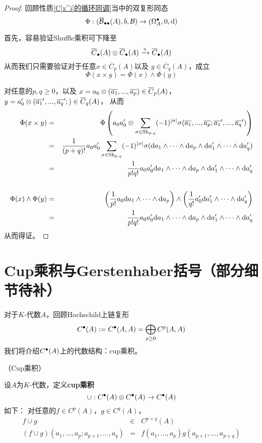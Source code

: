 \begin{proof}
回顾性质\ref{C[x^i]的循环同调}当中的双复形同态
$$\Phi:(\overline{\mathcal{B}}_{\bullet\bullet}(A),b,\mathcal{B})
\to(\Omega^{\bullet}_A,0,\mathrm{d})$$

首先，容易验证Shuffle乘积可下降至
$$\overline{C}_{\bullet}(A)\otimes\overline{C}_{\bullet}(A)
\xrightarrow{\times}\overline{C}_{\bullet}(A)$$
从而我们只需要验证对于任意$x\in\overline{C}_p(A)$以及
$y\in\overline{C}_q(A)$，成立
$$\Phi(x\times y)=\Phi(x)\wedge\Phi(y)$$

对任意的$p,q\geq 0$，以及
$x=a_0\otimes(\overline{a_1},...,\overline{a_p})\in\overline{C}_p(A)$，
$y=a_0'\otimes(\overline{a_1}',...,\overline{a_q}';)\in\overline{C}_q(A)$，
从而
\begin{eqnarray*}
     \Phi(x\times y)
&=&
     \Phi\left(
            a_0a_0'\otimes
            \sum_{\sigma\in\operatorname{Sh}_{p,q}}(-1)^{|\sigma|}
              \sigma(\overline{a_1},...,\overline{a_p};
                   \overline{a_1}',...,\overline{a_q}')
         \right)\\
&=&
     \frac{1}{(p+q)!}a_0a_0'
     \sum_{\sigma\in\operatorname{Sh}_{p,q}}(-1)^{|\sigma|}
       \sigma(\mathrm{d} a_1\wedge\cdots\wedge \mathrm{d} a_p
         \wedge \mathrm{d} a_1'\wedge\cdots\wedge\mathrm{d} a_q')\\
&=&
     \frac{1}{p!q!}
     a_0a_0'\mathrm{d} a_1\wedge\cdots\wedge \mathrm{d} a_p
     \wedge \mathrm{d} a_1'\wedge\cdots\wedge\mathrm{d} a_q'\\
& &
     \\
     \Phi(x)\wedge\Phi(y)
&=&
     \left(
       \frac{1}{p!}
       a_0\mathrm{d} a_1\wedge\cdots\wedge \mathrm{d} a_p
     \right)
     \wedge
     \left(
       \frac{1}{q!}
       a_0'\mathrm{d} a_1'\wedge\cdots\wedge \mathrm{d} a_q'
     \right)\\
&=&
     \frac{1}{p!q!}
     a_0a_0'\mathrm{d} a_1\wedge\cdots\wedge \mathrm{d} a_p
     \wedge \mathrm{d} a_1'\wedge\cdots\wedge\mathrm{d} a_q'
\end{eqnarray*}
从而得证。
\end{proof}


\section{Cup乘积与Gerstenhaber括号（部分细节待补）}
对于$K$-代数$A$，回顾Hochschild上链复形
$$C^{\bullet}(A):=C^{\bullet}(A,A)=\bigoplus_{p\geq 0}C^p(A,A)$$
我们将介绍$C^{\bullet}(A)$上的代数结构：cup乘积。


\begin{definition}（Cup乘积）

设$A$为$K$-代数，定义\textbf{cup乘积}
$$\cup:C^{\bullet}(A)\otimes C^{\bullet}(A)\to C^{\bullet}(A)$$
如下：%
对任意的$f\in C^p(A)$，$g\in C^q(A)$，%
\begin{eqnarray*}
f\cup g &\in& C^{p+q}(A)\\
(f\cup g)(a_1,...,a_p;a_{p+1},...,a_q)
&=&
f(a_1,...,a_p)g(a_{p+1},...,a_{p+q})
\end{eqnarray*}%
\end{definition}

